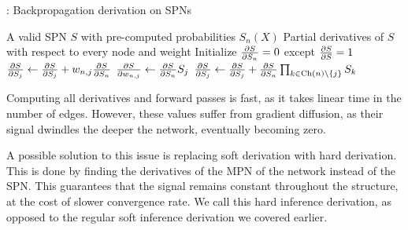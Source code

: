 \begin{algorithm}[H]
  \caption{: Backpropagation derivation on SPNs}
  \begin{algorithmic}[1]
    \Require A valid SPN $S$ with pre-computed probabilities $S_n(X)$
    \Ensure Partial derivatives of $S$ with respect to every node and weight
    \State Initialize $\frac{\partial S}{\partial S_n}=0$ except $\frac{\partial S}{\partial S}=1$
          \State $\frac{\partial S}{\partial S_j}\gets\frac{\partial S}{\partial S_j}+w_{n,j}\frac{\partial S}{\partial S_n}$
          \State $\frac{\partial S}{\partial w_{n,j}}\gets\frac{\partial S}{\partial S_n}S_j$
        \EndFor%
      \Else%
          \State $\frac{\partial S}{\partial S_j}\gets\frac{\partial S}{\partial S_j}+\frac{\partial S}{\partial S_n}\prod_{k\in\operatorname*{\text{Ch}}(n)\setminus
            \{j\}}S_k$
        \EndFor%
      \EndIf
    \EndFor%
  \end{algorithmic}
\end{algorithm}

Computing all derivatives and forward passes is fast, as it takes linear time in the number of
edges. However, these values suffer from gradient diffusion, as their signal dwindles the deeper
the network, eventually becoming zero.

A possible solution to this issue is replacing soft derivation with hard derivation. This is done
by finding the derivatives of the MPN of the network instead of the SPN\@. This guarantees that the
signal remains constant throughout the structure, at the cost of slower convergence rate. We call
this hard inference derivation, as opposed to the regular soft inference derivation we covered
earlier.

